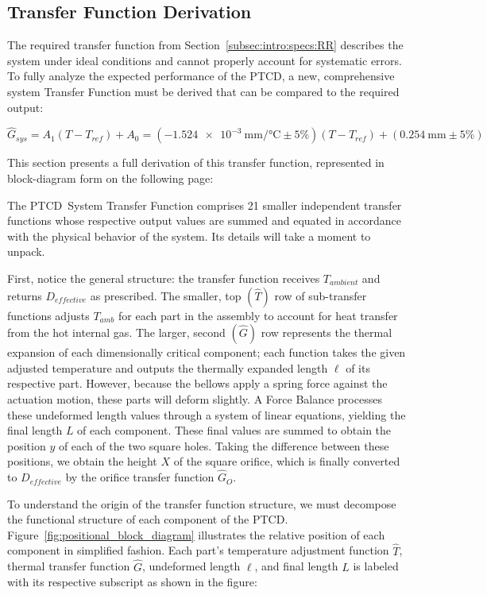 \documentclass[12pt, letterpaper]{report}%
\newcounter{mycounter}           %
\newcounter{sub}[mycounter]      %
\newcommand{\device}{PTCD}
\newcommand{\AoneExact}{\SI{-1.524e-3}{\milli\meter\per\celsius}}
\newcommand{\Aone}{\AoneExact \pm 5\%}
\newcommand{\AzeroExact}{\SI{0.254}{\milli\meter}}
\newcommand{\Azero}{\AzeroExact \pm 5\%}
\begin{document}
\begin{appendices}
	\section{Transfer Function Derivation}
	\label{app:sat:TF}

		The required transfer function from Section~\ref{subsec:intro:specs:RR} describes the system under ideal conditions and cannot properly account for systematic errors.
		To fully analyze the expected performance of the \device, a new, comprehensive system Transfer Function must be derived that can be compared to the required output: 

		\begin{equation}
			\hat{G}_{sys} = A_1 (T-T_{ref}) + A_0 = (\Aone)(T-T_{ref}) + (\Azero)
			\label{eq:req_TF}
		\end{equation}

		This section presents a full derivation of this transfer function, represented in block-diagram form on the following page:
		

		The \device\ System Transfer Function comprises 21 smaller independent transfer functions whose respective output values are summed and equated in accordance with the physical behavior of the system.
		Its details will take a moment to unpack.

		First, notice the general structure: the transfer function receives $T_{ambient}$ and returns $D_{effective}$ as prescribed.
		The smaller, top $(\hat{T})$ row of sub-transfer functions adjusts $T_{amb}$ for each part in the assembly to account for heat transfer from the hot internal gas.
		The larger, second $(\hat{G})$ row represents the thermal expansion of each dimensionally critical component; each function takes the given adjusted temperature and outputs the thermally expanded length $\ell$ of its respective part.
		However, because the bellows apply a spring force against the actuation motion, these parts will deform slightly. A Force Balance processes these undeformed length values through a system of linear equations, yielding the final length $L$ of each component.
		These final values are summed to obtain the position $y$ of each of the two square holes. Taking the difference between these positions, we obtain the height $X$ of the square orifice, which is finally converted to $D_{effective}$ by the orifice transfer function $\hat{G}_O$.
		
		To understand the origin of the transfer function structure, we must decompose the functional structure of each component of the \device.
		Figure~\ref{fig:positional_block_diagram} illustrates the relative position of each component in simplified fashion.
		Each part's temperature adjustment function $\hat{T}$, thermal transfer function $\hat{G}$, undeformed length $\ell$, and final length $L$ is labeled with its respective subscript as shown in the figure:
		

\end{appendices}
\end{document}
